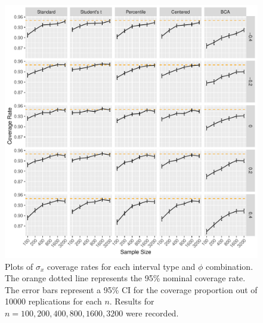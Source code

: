 \documentclass[12pt, letterpaper, titlepage]{article}
\begin{document}
\begin{figure}[tbp]
  \centering
  \includegraphics[width=\textwidth]{figures/plot_sigma}
  \caption{Plots of $\sigma_x$ coverage rates for each interval type and $\phi$
    combination. The orange dotted line represents the 95\% nominal coverage
    rate. The error bars represent a 95\% CI for the coverage
    proportion out of 10000 replications for each $n$. Results for 
    $n = 100, 200, 400, 800, 1600, 3200$ were recorded.}
  \label{fig:sigma}
\end{figure}
\end{document}
